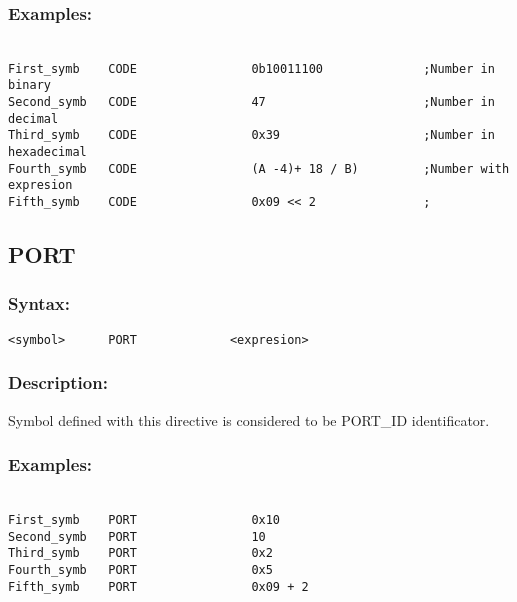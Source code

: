 {        \subsubsection{Examples:}
            {
                ~\\
                \usecodefont
                \verb'First_symb    CODE                0b10011100              ;Number in binary'\\
                \verb'Second_symb   CODE                47                      ;Number in decimal'\\
                \verb'Third_symb    CODE                0x39                    ;Number in hexadecimal'\\
                \verb'Fourth_symb   CODE                (A -4)+ 18 / B)         ;Number with expresion'\\
                \verb'Fifth_symb    CODE                0x09 << 2               ;'\\
            }
            
    \subsection{PORT}
        \subsubsection{Syntax:}
            \verb'<symbol>      PORT             <expresion>'

        \subsubsection{Description:}
        Symbol defined with this directive is considered to be PORT\_ID identificator.

        \subsubsection{Examples:}
            {
                ~\\
                \usecodefont
                \verb'First_symb    PORT                0x10    '\\
                \verb'Second_symb   PORT                10      '\\
                \verb'Third_symb    PORT                0x2     '\\
                \verb'Fourth_symb   PORT                0x5     '\\
                \verb'Fifth_symb    PORT                0x09 + 2'\\
            }
}
